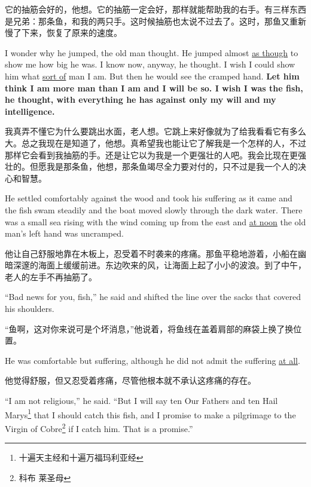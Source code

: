 \begin{paracol}{2}
\switchcolumn

它的抽筋会好的，他想。它的抽筋一定会好，那样就能帮助我的右手。有三样东西是兄弟：那条鱼，和我的两只手。这时候抽筋也太说不过去了。这时，那鱼又重新慢了下来，恢复了原来的速度。

\switchcolumn*

I wonder why he jumped, the old man thought. He jumped almost \uline{as
  though} to show me how big he was. I know now, anyway, he thought. I wish
I could show him what \uline{sort of} man I am. But then he would see the
cramped hand. \textbf{Let him think I am more man than I am and I will be
  so. I wish I was the fish, he thought, with everything he has against only
  my will and my intelligence.}

\switchcolumn

我真弄不懂它为什么要跳出水面，老人想。它跳上来好像就为了给我看看它有多么大。总之我现在是知道了，他想。真希望我也能让它了解我是一个怎样的人，不过那样它会看到我抽筋的手。还是让它以为我是一个更强壮的人吧。我会比现在更强壮的。但愿我是那条鱼，他想，那条鱼竭尽全力要对付的，只不过是我一个人的决心和智慧。

\switchcolumn*

He settled comfortably against the wood and took his \gls{suffering} as it
came and the fish swam steadily and the boat moved slowly through the dark
water. There was a small sea rising with the wind coming up from the east
and \uline{at noon} the old man's left hand was uncramped.

\switchcolumn

他让自己舒服地靠在木板上，忍受着不时袭来的疼痛。那鱼平稳地游着，小船在幽暗深邃的海面上缓缓前进。东边吹来的风，让海面上起了小小的波浪。到了中午，老人的左手不再抽筋了。

\switchcolumn*

``Bad news for you, fish,'' he said and shifted the line over the sacks that
covered his shoulders.

\switchcolumn

“鱼啊，这对你来说可是个坏消息，”他说着，将鱼线在盖着肩部的麻袋上换了换位置。

\switchcolumn*

He was comfortable but suffering, although he did not \gls{admit} the
suffering \uline{at all}.

\switchcolumn

他觉得舒服，但又忍受着疼痛，尽管他根本就不承认这疼痛的存在。

\switchcolumn*

``I am not \gls{religious},'' he said. ``But I will say ten Our Fathers and
ten Hail Marys\footnote{十遍天主经和十遍万福玛利亚经} that I should catch this fish,
and I promise to make a \gls{pilgrimage} to the Virgin of Cobre\footnote{科布
  莱圣母} if I catch him. That is a promise.''


\end{paracol}
